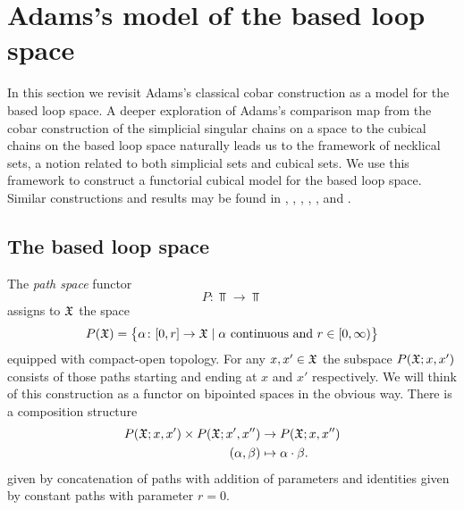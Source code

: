 
\section{Adams's model of the based loop space}\label{s:theorem1}

In this section we revisit Adams's classical cobar construction as a model for the based loop space.
A deeper exploration of Adams's comparison map from the cobar construction of the simplicial singular chains on a space to the cubical chains on the based loop space naturally leads us to the framework of necklical sets, a notion related to both simplicial sets and cubical sets.
We use this framework to construct a functorial cubical model for the based loop space.
Similar constructions and results may be found in \cite{baues1980geometry}, \cite{berger1995loops}, \cite{baues1998hopf}, \cite{dugger2011rigidification}, \cite{galvez2020hopf}, and \cite{rivera2018cubical, rivera2019path}.

%

\subsection{The based loop space}

The \textit{path space} functor
\[
P \colon \Top \to \Top
\]
assigns to $\mathfrak{X}$ the space
\[
P(\mathfrak{X}) = \big\{\alpha \colon [0,r] \to \mathfrak{X} \mid \text{$\alpha$ continuous and } r \in [0,\infty)\big\}
\]
equipped with compact-open topology.
For any $x,x' \in \mathfrak{X}$ the subspace $P(\mathfrak{X};x,x')$ consists of those paths starting and ending at $x$ and $x'$ respectively.
We will think of this construction as a functor on bipointed spaces in the obvious way.
There is a composition structure
\begin{equation}\label{eq:composition structure}
	\begin{split}
		P(\mathfrak{X};x,x') \times P(\mathfrak{X};x',x'') &\to P(\mathfrak{X};x,x'') \\
		(\alpha, \beta) &\mapsto \alpha \cdot \beta.
	\end{split}
\end{equation}
given by concatenation of paths with addition of parameters and identities given by constant paths with parameter $r=0$.

